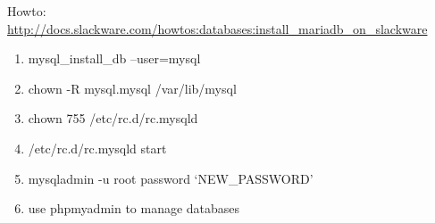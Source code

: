 \documentclass[letterpaper,10pt,english]{sphinxmanual}
\begin{document}
Howto: \href{http://docs.slackware.com/howtos:databases:install\_mariadb\_on\_slackware}{http://docs.slackware.com/howtos:databases:install\_mariadb\_on\_slackware}
\begin{enumerate}
\item {} 
mysql\_install\_db --user=mysql

\item {} 
chown -R mysql.mysql /var/lib/mysql

\item {} 
chown 755 /etc/rc.d/rc.mysqld

\item {} 
/etc/rc.d/rc.mysqld start

\item {} 
mysqladmin -u root password `NEW\_PASSWORD'

\item {} 
use phpmyadmin to manage databases

\end{enumerate}
\end{document}
